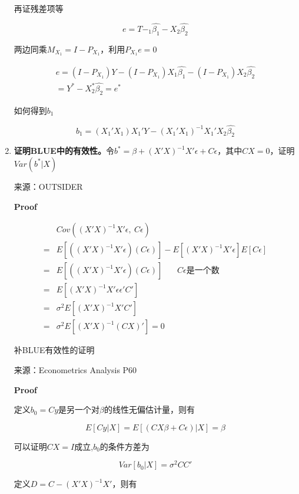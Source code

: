 \documentclass{article}
\begin{document}
\begin{enumerate}
        再证残差项等
        
        $$
          e = T - _1\widehat{\beta_1}-X_2\widehat{\beta_2}
        $$
        
        两边同乘$M_{X_1} = I-P_{X_1}$，利用$P_{X_1}e=0$
        
        $$
          \begin{aligned}
            e = (I-P_{X_1})Y-(I-P_{X_1})X_1\widehat{\beta_1} - (I-P_{X_1})X_2\widehat{\beta_2} \\
            = Y^* - X_2^*\widehat{\beta_2}=e^*
          \end{aligned}
        $$
        
        如何得到$b_1$
        
        $$
          b_1 = (X_1'X_1)X_1'Y-(X_1'X_1)^{-1}X_1'X_2\widehat{\beta_2}
        $$

    \item \textbf{证明BLUE中的有效性。}令$b^{*}=\beta+(X'X)^{-1}X'\epsilon+C\epsilon$，其中$CX=0$，证明$Var(b^*|X)$
    
    来源：OUTSIDER
    
    \textbf{Proof}
    
    $$
      \begin{aligned}
        &Cov((X'X)^{-1}X'\epsilon,\ C\epsilon) \\
        = &E[((X'X)^{-1}X'\epsilon)(C\epsilon)] - E[(X'X)^{-1}X'\epsilon]E[C\epsilon] \\
        = &E[((X'X)^{-1}X'\epsilon)(C\epsilon)] \ \ \ \ \ \ \ \ C\epsilon\text{是一个数}\\
        = &E[(X'X)^{-1}X'\epsilon\epsilon'C'] \\
        = &\sigma^2E[(X'X)^{-1}X'C'] \\
        = &\sigma^2E[(X'X)^{-1}(CX)'] = 0
      \end{aligned}
    $$
    
    补BLUE有效性的证明
    
    来源：Econometrics Analysis P60
    
    \textbf{Proof}
    
    定义$b_0=Cy$是另一个对$\beta$的线性无偏估计量，则有
    
    $$
    E[Cy|X] = E[(CX\beta+C\epsilon)|X] = \beta
    $$
    
    可以证明$CX=I$成立,$b_0$的条件方差为
    
    $$
    Var[b_0|X] = \sigma^2CC'
    $$
    
    定义$D=C-(X'X)^{-1}X'$，则有
    

\end{enumerate}
\end{document}
